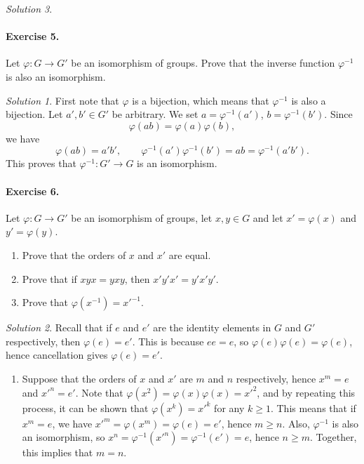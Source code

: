 \documentclass[11pt]{report}
\theoremstyle{remark}
\newtheorem*{solution}{Solution}
\begin{document}
\begin{solution}
    \paragraph{Exercise 5.} Let $\varphi\colon G \to G'$ be an isomorphism of groups.
    Prove that the inverse function $\varphi^{-1}$ is also an isomorphism.
    \begin{solution}
        First note that $\varphi$ is a bijection, which means that $\varphi^{-1}$ is
        also a bijection. Let $a', b' \in G'$ be arbitrary. We set $a =
        \varphi^{-1}(a')$, $b = \varphi^{-1}(b')$. Since \[
            \varphi(ab) = \varphi(a)\varphi(b),
        \] we have \[
            \varphi(ab) = a'b', \qquad \varphi^{-1}(a') \varphi^{-1}(b') = ab =
            \varphi^{-1}(a'b').
        \] This proves that $\varphi^{-1}\colon G' \to G$ is an isomorphism.
    \end{solution}

    \paragraph{Exercise 6.} Let $\varphi\colon G \to G'$ be an isomorphism of groups,
    let $x, y \in G$ and let $x' = \varphi(x)$ and $y' = \varphi(y)$.
    \begin{enumerate}
        \itemsep0em
        \item Prove that the orders of $x$ and $x'$ are equal.
        \item Prove that if $xyx = yxy$, then $x'y'x' = y'x'y'$.
        \item Prove that $\varphi(x^{-1}) = x'^{-1}$.
    \end{enumerate}
    \begin{solution}
        Recall that if $e$ and $e'$ are the identity elements in $G$ and $G'$
        respectively, then $\varphi(e) = e'$. This is because $ee = e$, so
        $\varphi(e)\varphi(e) = \varphi(e)$, hence cancellation gives $\varphi(e) =
        e'$.
        \begin{enumerate}
            \item Suppose that the orders of $x$ and $x'$ are $m$ and $n$
            respectively, hence $x^m = e$ and $x'^n = e'$. Note that $\varphi(x^2) =
            \varphi(x)\varphi(x) = x'^2$, and by repeating this process, it can be
            shown that $\varphi(x^k) = x'^{k}$ for any $k \geq 1$. This means that
            if $x^m = e$, we have $x'^m = \varphi(x^m) = \varphi(e) = e'$, hence $m
            \geq n$. Also, $\varphi^{-1}$ is also an isomorphism, so $x^n =
            \varphi^{-1}(x'^{n}) = \varphi^{-1}(e') = e$, hence $n \geq m$.
            Together, this implies that $m = n$.


\end{enumerate}
\end{solution}
\end{solution}
\end{document}
